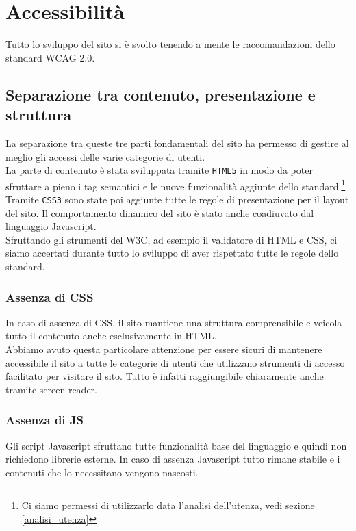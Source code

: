 \section{Accessibilità}
Tutto lo sviluppo del sito si è svolto tenendo a mente le raccomandazioni dello standard WCAG 2.0.

\subsection{Separazione tra contenuto, presentazione e struttura}
La separazione tra queste tre parti fondamentali del sito ha permesso di gestire al meglio gli accessi delle varie categorie di utenti.\\
La parte di contenuto è stata sviluppata tramite \texttt{HTML5} in modo da poter sfruttare a pieno i tag semantici e le nuove funzionalità aggiunte dello standard.\footnote{Ci siamo permessi di utilizzarlo data l'analisi dell'utenza, vedi sezione \ref{analisi_utenza}}\\
Tramite \texttt{CSS3} sono state poi aggiunte tutte le regole di presentazione per il layout del sito. Il comportamento dinamico del sito è stato anche coadiuvato dal linguaggio Javascript.\\
Sfruttando gli strumenti del W3C, ad esempio il validatore di HTML e CSS, ci siamo accertati durante tutto lo sviluppo di aver rispettato tutte le regole dello standard.

\subsubsection{Assenza di CSS}
In caso di assenza di CSS, il sito mantiene una struttura comprensibile e veicola tutto il contenuto anche esclusivamente in HTML.\\
Abbiamo avuto questa particolare attenzione per essere sicuri di mantenere accessibile il sito a tutte le categorie di utenti che utilizzano strumenti di accesso facilitato per visitare il sito. Tutto è infatti raggiungibile chiaramente anche tramite screen-reader.

\subsubsection{Assenza di JS}
Gli script Javascript sfruttano tutte funzionalità base del linguaggio e quindi non richiedono librerie esterne. In caso di assenza Javascript tutto rimane stabile e i contenuti che lo necessitano vengono nascosti. 

